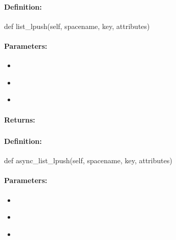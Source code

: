 \paragraph{Definition:}
\begin{pythoncode}
def list_lpush(self, spacename, key, attributes)
\end{pythoncode}

\paragraph{Parameters:}
\begin{itemize}[noitemsep]
\item {}\\

\item {}\\

\item {}\\

\end{itemize}

\paragraph{Returns:}


\pagebreak
\subsubsection{}
\label{api:python:async_list_lpush}


\paragraph{Definition:}
\begin{pythoncode}
def async_list_lpush(self, spacename, key, attributes)
\end{pythoncode}

\paragraph{Parameters:}
\begin{itemize}[noitemsep]
\item {}\\

\item {}\\

\item {}\\

\end{itemize}

